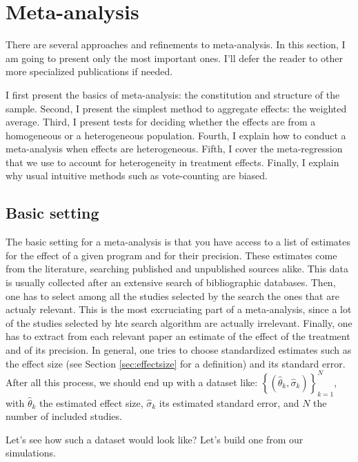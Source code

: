 \documentclass[]{book}
\theoremstyle{definition}
\theoremstyle{definition}
\theoremstyle{definition}
\theoremstyle{remark}
\let\BeginKnitrBlock\begin \let\EndKnitrBlock\end
\begin{document}
\section{Meta-analysis}\label{meta-analysis}

There are several approaches and refinements to meta-analysis. In this
section, I am going to present only the most important ones. I'll defer
the reader to other more specialized publications if needed.

I first present the basics of meta-analysis: the constitution and
structure of the sample. Second, I present the simplest method to
aggregate effects: the weighted average. Third, I present tests for
deciding whether the effects are from a homogeneous or a heterogeneous
population. Fourth, I explain how to conduct a meta-analysis when
effects are heterogeneous. Fifth, I cover the meta-regression that we
use to account for heterogeneity in treatment effects. Finally, I
explain why usual intuitive methods such as vote-counting are biased.

\subsection{Basic setting}\label{basic-setting}

The basic setting for a meta-analysis is that you have access to a list
of estimates for the effect of a given program and for their precision.
These estimates come from the literature, searching published and
unpublished sources alike. This data is usually collected after an
extensive search of bibliographic databases. Then, one has to select
among all the studies selected by the search the ones that are actualy
relevant. This is the most excruciating part of a meta-analysis, since a
lot of the studies selected by hte search algorithm are actually
irrelevant. Finally, one has to extract from each relevant paper an
estimate of the effect of the treatment and of its precision. In
general, one tries to choose standardized estimates such as the effect
size (see Section \ref{sec:effectsize} for a definition) and its
standard error. After all this process, we should end up with a dataset
like: \(\left\{(\hat{\theta}_k,\hat{\sigma}_k)\right\}_{k=1}^N\), with
\(\hat{\theta}_k\) the estimated effect size, \(\hat{\sigma}_k\) its
estimated standard error, and \(N\) the number of included studies.

\BeginKnitrBlock{example}
\protect\hypertarget{exm:unnamed-chunk-139}{}{\label{exm:unnamed-chunk-139}
}Let's see how such a dataset would look like? Let's build one from our
simulations.
\EndKnitrBlock{example}
\end{document}
